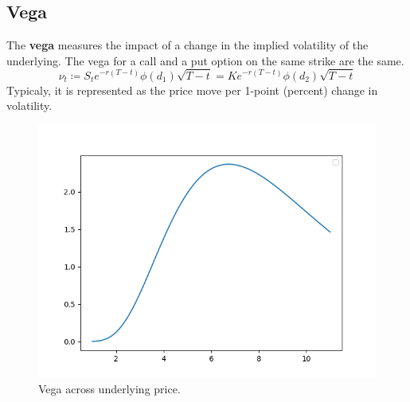 \documentclass{article}
\begin{document}
  \subsection{Vega}

    \begin{definition}[Vega]
      The \textbf{vega} measures the impact of a change in the implied volatility of the underlying. The vega for a call and a put option on the same strike are the same. 
      \begin{equation}
        \nu_t \coloneqq S_t e^{-r (T - t)} \phi(d_1) \sqrt{T - t} = K e^{-r (T - t)} \phi(d_2) \sqrt{T - t}
      \end{equation}
      Typicaly, it is represented as the price move per 1-point (percent) change in volatility. 
      \begin{figure}[H]
        \centering 
        \includegraphics[scale=0.4]{img/vega.png}
        \caption{Vega across underlying price. } 
        \label{fig:vega}
      \end{figure}
    \end{definition}
\end{document}
